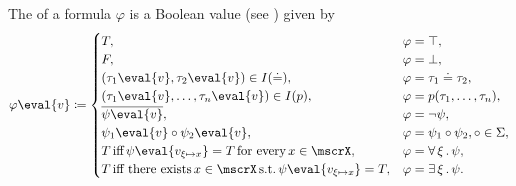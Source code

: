 \begin{definition}
\begin{defenum}
     The  of a formula \( \varphi \) is a Boolean value (see ) given by
    \begin{equation}\label{eq:def:first_order_valuation/formula_valuation}
      \varphi\eval{v} \coloneqq \begin{cases}
        T,                                                                              &\varphi = \top, \\
        F,                                                                              &\varphi = \bot, \\
        (\tau_1\eval{v}, \tau_2\eval{v}) \in I(\doteq),                         &\varphi = \tau_1 \doteq \tau_2, \\
        (\tau_1\eval{v}, \ldots, \tau_n\eval{v}) \in I(p),                      &\varphi = p(\tau_1, \ldots, \tau_n), \\
        \overline{\psi\eval{v}},                                                          &\varphi = \neg \psi, \\
        \psi_1\eval{v} \circ \psi_2\eval{v},                                    &\varphi = \psi_1 \circ \psi_2, \circ \in \Sigma, \\
        T \T{iff} \psi\eval{v_{\xi \mapsto x}} = T \T{for every} x \in \mscrX,         &\varphi = \qforall{\xi} \psi, \\
        T \T{iff there exists} x \in \mscrX \T{s.t.} \psi\eval{v_{\xi \mapsto x}} = T, &\varphi = \qexists{\xi} \psi.
      \end{cases}
    \end{equation}
  \end{defenum}
\end{definition}

